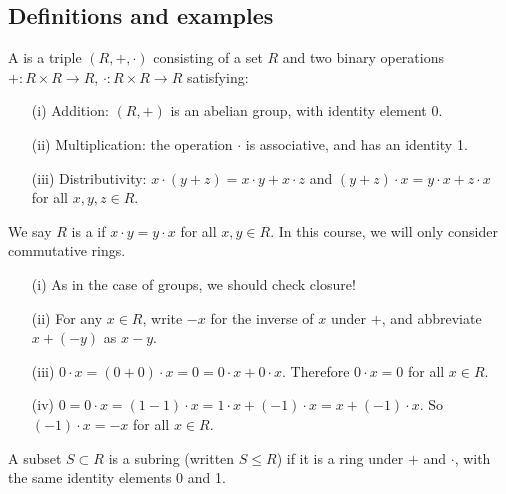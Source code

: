 \documentclass[egregdoesnotlikesansseriftitles,a4paper]{scrartcl}
\begin{document}
\subsection{Definitions and examples}
\begin{definition*}[Ring]
       A  is a triple $(R, +, \cdot )$ consisting of a set $R$ and two binary operations $+: R \times R \rightarrow R$, $\cdot  : R \times R \rightarrow R$ satisfying: 
       \begin{itemize}
             \item[(i)] Addition: $(R,+)$ is an abelian group, with identity element 0.
             \item[(ii)] Multiplication: the operation $\cdot $ is associative, and has an identity 1.
             \item[(iii)] Distributivity: $x \cdot  (y+z)= x \cdot y + x \cdot  z$ and $(y +z) \cdot  x=y \cdot x +z \cdot  x $ for all $x,y,z \in R$.
       \end{itemize}
       We say $R$ is a  if $x \cdot  y= y \cdot  x$ for all $x,y \in R$. In this course, we will only consider commutative rings.
\end{definition*}
\begin{remarks}\leavevmode
       \begin{itemize}
             \item[(i)] As in the case of groups, we should check closure!
             \item[(ii)] For any $x \in R$, write $-x$ for the inverse of $x$ under $+$, and abbreviate $x+ (-y)$ as $x-y$.
             \item[(iii)] $0 \cdot x= (0+0)\cdot x=0=0 \cdot x+ 0 \cdot x $. Therefore $0 \cdot x=0$ for all $x \in R$.
             \item[(iv)] $0=0 \cdot  x=(1-1) \cdot  x= 1 \cdot x + (-1) \cdot x=x+ (-1)\cdot x$. So $(-1)\cdot  x=-x$ for all $x \in R$.
       \end{itemize}
\end{remarks}
\begin{definition*}[Subring]
       A subset $S \subset R$ is a subring (written $S \leq R$) if it is a ring under $+$ and $\cdot $, with the same identity elements 0 and 1.
\end{definition*}
\end{document}
